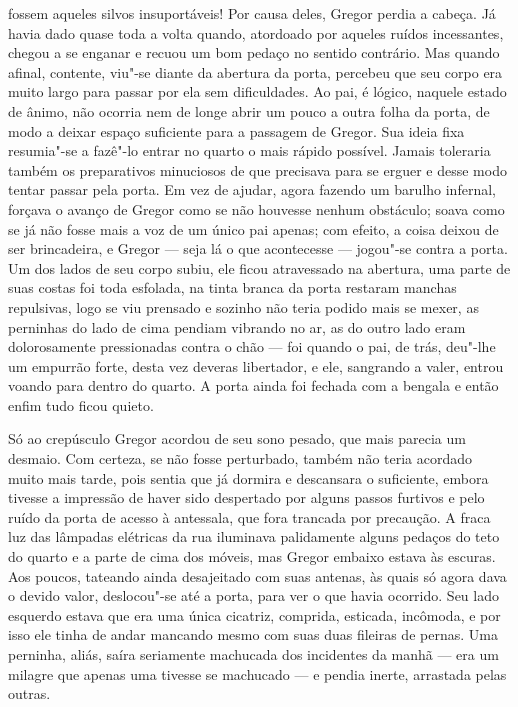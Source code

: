 fossem aqueles silvos insuportáveis! Por causa deles, Gregor perdia a
cabeça. Já havia dado quase toda a volta quando, atordoado por aqueles
ruídos incessantes, chegou a se enganar e recuou um bom pedaço no sentido
contrário. Mas quando afinal, contente, viu"-se diante da abertura da
porta, percebeu que seu corpo era muito largo para passar por ela sem
dificuldades. Ao pai, é lógico, naquele estado de ânimo, não ocorria nem
de longe abrir um pouco a outra folha da porta, de modo a deixar espaço
suficiente para a passagem de Gregor. Sua ideia fixa resumia"-se a fazê"-lo
entrar no quarto o mais rápido possível. Jamais toleraria também os
preparativos minuciosos de que precisava para se erguer e desse modo
tentar passar pela porta. Em vez de ajudar, agora fazendo um barulho infernal,
forçava o avanço de Gregor como se não houvesse nenhum obstáculo; soava
como se já não fosse mais a voz de um único pai apenas; com efeito, a
coisa deixou de ser brincadeira, e Gregor --- seja lá o que acontecesse ---
jogou"-se contra a porta. Um dos lados de seu corpo subiu, ele ficou
atravessado na abertura, uma parte de suas costas foi toda esfolada, na
tinta branca da porta restaram manchas repulsivas, logo se viu prensado e
sozinho não teria podido mais se mexer, as perninhas do lado de cima
pendiam vibrando no ar, as do outro lado eram dolorosamente pressionadas
contra o chão --- foi quando o pai, de trás, deu"-lhe um empurrão forte,
desta vez deveras libertador, e ele, sangrando a valer, entrou voando para
dentro do quarto. A porta ainda foi fechada com a bengala e então enfim
tudo ficou quieto. 

\pagebreak
\sectionitem

Só ao crepúsculo Gregor acordou de seu sono pesado, que mais parecia um
desmaio. Com certeza, se não fosse perturbado, também não teria acordado
muito mais tarde, pois sentia que já dormira e descansara o suficiente,
embora tivesse a impressão de haver sido despertado por alguns passos
furtivos e pelo ruído da porta de acesso à antessala, que fora trancada
por precaução. A fraca luz das lâmpadas elétricas da rua iluminava
palidamente alguns pedaços do teto do quarto e a parte de cima dos móveis,
mas Gregor embaixo estava às escuras. Aos poucos, tateando ainda
desajeitado com suas antenas, às quais só agora dava o devido valor,
deslocou"-se até a porta, para ver o que havia ocorrido. Seu lado esquerdo
estava que era uma única cicatriz, comprida, esticada, incômoda, e por
isso ele tinha de andar mancando mesmo com suas duas fileiras de pernas.
Uma perninha, aliás, saíra seriamente machucada dos incidentes da manhã ---
era um milagre que apenas uma tivesse se machucado --- e pendia inerte,
arrastada pelas outras.

